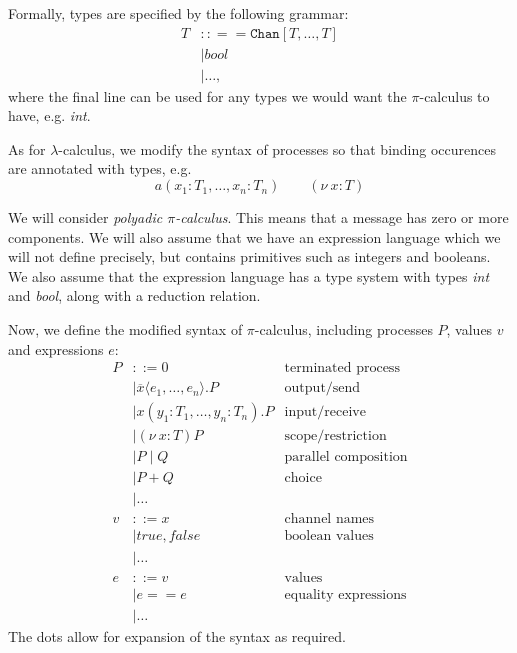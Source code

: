 \documentclass[a4paper, openany]{memoir}
\theoremstyle{definition}
\begin{document}
    Formally, types are specified by the following grammar:
    \begin{align*}
        T &:: == \texttt{Chan}[T, \dots, T] \\
        &\mid \textit{bool} \\
        &\mid \dots,
    \end{align*}
    where the final line can be used for any types we would want the $\pi$-calculus to have, e.g. \textit{int}.

    As for $\lambda$-calculus, we modify the syntax of processes so that binding occurences are annotated with types, e.g.
    \[a(x_1 \colon T_1, \dots, x_n \colon T_n) \qquad (\nu \ x \colon T)\]
    
    We will consider \emph{polyadic $\pi$-calculus}. This means that a message has zero or more components. We will also assume that we have an expression language which we will not define precisely, but contains primitives such as integers and booleans. We also assume that the expression language has a type system with types \textit{int} and \textit{bool}, along with a reduction relation.

    Now, we define the modified syntax of $\pi$-calculus, including processes $P$, values $v$ and expressions $e$:
    \begin{align*}
        P &::= 0  & \textrm{terminated process} \\
        &\mid \overline{x} \langle e_1, \dots, e_n \rangle.P & \textrm{output/send} \\
        &\mid x(y_1 \colon T_1, \dots, y_n \colon T_n).P & \textrm{input/receive} \\
        &\mid (\nu  \ x \colon T)P & \textrm{scope/restriction} \\
        &\mid P \mid Q & \textrm{parallel composition} \\
        &\mid P + Q & \textrm{choice} \\
        &\mid \dots \\
        v &::= x & \textrm{channel names} \\
        &\mid \textit{true}, \textit{false} & \textrm{boolean values} \\
        &\mid \dots \\
        e &::= v & \textrm{values} \\
        &\mid e == e & \textrm{equality expressions} \\
        &\mid \dots
    \end{align*}
    The dots allow for expansion of the syntax as required.
\end{document}
